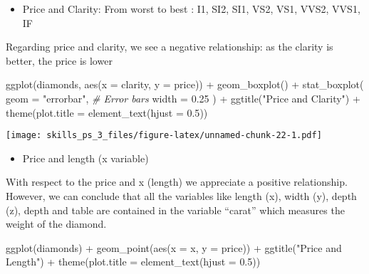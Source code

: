 \documentclass[
]{article}
\newenvironment{Shaded}{\begin{snugshade}}{\end{snugshade}}
\newcommand{\AttributeTok}[1]{\textcolor[rgb]{0.77,0.63,0.00}{#1}}
\newcommand{\CommentTok}[1]{\textcolor[rgb]{0.56,0.35,0.01}{\textit{#1}}}
\newcommand{\FloatTok}[1]{\textcolor[rgb]{0.00,0.00,0.81}{#1}}
\newcommand{\FunctionTok}[1]{\textcolor[rgb]{0.00,0.00,0.00}{#1}}
\newcommand{\NormalTok}[1]{#1}
\newcommand{\SpecialCharTok}[1]{\textcolor[rgb]{0.00,0.00,0.00}{#1}}
\newcommand{\StringTok}[1]{\textcolor[rgb]{0.31,0.60,0.02}{#1}}
\providecommand{\tightlist}{%
  \setlength{\itemsep}{0pt}\setlength{\parskip}{0pt}}
\begin{document}
\begin{itemize}
\tightlist
\item
  Price and Clarity: From worst to best : I1, SI2, SI1, VS2, VS1, VVS2,
  VVS1, IF
\end{itemize}

Regarding price and clarity, we see a negative relationship: as the
clarity is better, the price is lower

\begin{Shaded}
\begin{Highlighting}[]
\FunctionTok{ggplot}\NormalTok{(diamonds, }\FunctionTok{aes}\NormalTok{(}\AttributeTok{x =}\NormalTok{ clarity, }\AttributeTok{y =}\NormalTok{ price)) }\SpecialCharTok{+} 
  \FunctionTok{geom\_boxplot}\NormalTok{() }\SpecialCharTok{+}
  \FunctionTok{stat\_boxplot}\NormalTok{(}
    \AttributeTok{geom =} \StringTok{"errorbar"}\NormalTok{, }\CommentTok{\# Error bars}
    \AttributeTok{width =} \FloatTok{0.25}
\NormalTok{  ) }\SpecialCharTok{+}
  \FunctionTok{ggtitle}\NormalTok{(}\StringTok{"Price and Clarity"}\NormalTok{) }\SpecialCharTok{+}
  \FunctionTok{theme}\NormalTok{(}\AttributeTok{plot.title =} \FunctionTok{element\_text}\NormalTok{(}\AttributeTok{hjust =} \FloatTok{0.5}\NormalTok{))}
\end{Highlighting}
\end{Shaded}

\texttt{[image: skills\_ps\_3\_files/figure-latex/unnamed-chunk-22-1.pdf]}

\begin{itemize}
\tightlist
\item
  Price and length (x variable)
\end{itemize}

With respect to the price and x (length) we appreciate a positive
relationship. However, we can conclude that all the variables like
length (x), width (y), depth (z), depth and table are contained in the
variable ``carat'' which measures the weight of the diamond.

\begin{Shaded}
\begin{Highlighting}[]
\FunctionTok{ggplot}\NormalTok{(diamonds) }\SpecialCharTok{+} 
  \FunctionTok{geom\_point}\NormalTok{(}\FunctionTok{aes}\NormalTok{(}\AttributeTok{x =}\NormalTok{ x, }\AttributeTok{y =}\NormalTok{ price)) }\SpecialCharTok{+}
  \FunctionTok{ggtitle}\NormalTok{(}\StringTok{"Price and Length"}\NormalTok{) }\SpecialCharTok{+}
  \FunctionTok{theme}\NormalTok{(}\AttributeTok{plot.title =} \FunctionTok{element\_text}\NormalTok{(}\AttributeTok{hjust =} \FloatTok{0.5}\NormalTok{))}
\end{Highlighting}
\end{Shaded}
\end{document}

